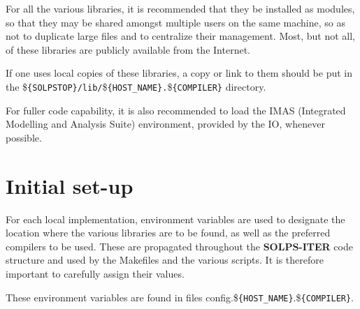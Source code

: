 \documentclass[a4paper,10pt]{report}
\newcommand\SOLPSITER{{\bf SOLPS-ITER} }
\begin{document}
For all the various libraries, it is recommended that they be installed as modules, so that they
may be shared amongst multiple users on the same machine, so as not to duplicate large files and to
centralize their management. Most, but not all, of these libraries are publicly available from the
Internet.

If one uses local copies of these libraries, a copy or link to them should be put in the
\${\tt \{SOLPSTOP\}/lib/}\${\tt \{HOST\_NAME\}.\allowbreak}\${\tt \{COMPILER\}} directory.

For fuller code capability, it is also recommended to load the IMAS (Integrated Modelling and Analysis Suite) environment, provided by the IO, whenever possible.

\section{Initial set-up}

For each local implementation, environment variables are used to designate
the location where the various libraries are to be found, as well as the preferred compilers to be
used. These are propagated throughout the \SOLPSITER code structure and used by the Makefiles and
the various scripts. It is therefore important to carefully assign their values.

These environment variables are found in files config.\${\tt \{HOST\_NAME\}}.\${\tt \{COMPILER\}}.
\end{document}

